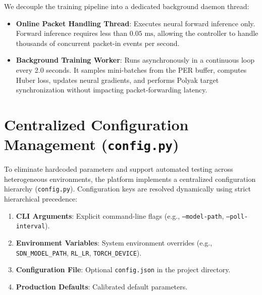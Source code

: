 We decouple the training pipeline into a dedicated background daemon thread:
\begin{itemize}
    \item \textbf{Online Packet Handling Thread}: Executes neural forward inference only. Forward inference requires less than $0.05\text{ ms}$, allowing the controller to handle thousands of concurrent packet-in events per second.
    \item \textbf{Background Training Worker}: Runs asynchronously in a continuous loop every 2.0 seconds. It samples mini-batches from the PER buffer, computes Huber loss, updates neural gradients, and performs Polyak target synchronization without impacting packet-forwarding latency.
\end{itemize}

\section{Centralized Configuration Management (\texttt{config.py})}
To eliminate hardcoded parameters and support automated testing across heterogeneous environments, the platform implements a centralized configuration hierarchy (\texttt{config.py}). Configuration keys are resolved dynamically using strict hierarchical precedence:
\begin{enumerate}
    \item \textbf{CLI Arguments}: Explicit command-line flags (e.g., \texttt{--model-path}, \texttt{--poll-interval}).
    \item \textbf{Environment Variables}: System environment overrides (e.g., \texttt{SDN\_MODEL\_PATH}, \texttt{RL\_LR}, \texttt{TORCH\_DEVICE}).
    \item \textbf{Configuration File}: Optional \texttt{config.json} in the project directory.
    \item \textbf{Production Defaults}: Calibrated default parameters.
\end{enumerate}

